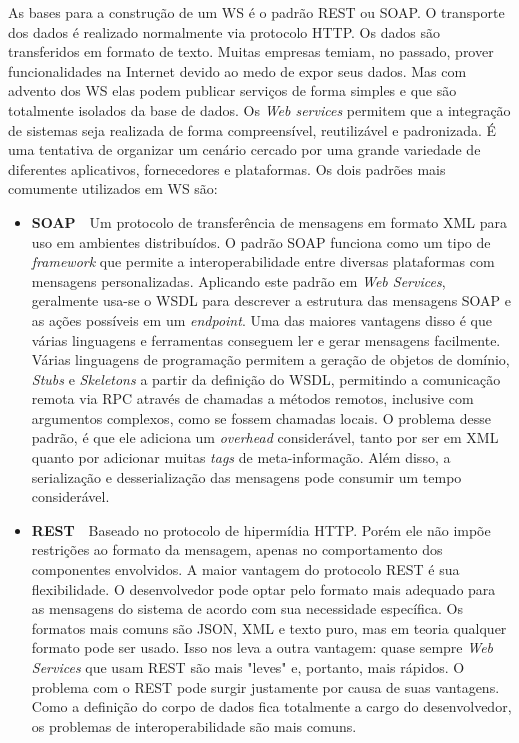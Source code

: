 As bases para a construção de um WS é o padrão REST ou SOAP. O transporte dos dados é realizado normalmente via protocolo HTTP. Os dados são transferidos em formato de texto. Muitas empresas temiam, no passado, prover funcionalidades na Internet devido ao medo de expor seus dados. Mas com advento dos WS elas podem publicar serviços de forma simples e que são totalmente isolados da base de dados. Os \textit{Web services} permitem que a integração de sistemas seja realizada de forma compreensível, reutilizável e padronizada. É uma tentativa de organizar um cenário cercado por uma grande variedade de diferentes aplicativos, fornecedores e plataformas. Os dois padrões mais comumente utilizados em WS são:
\begin{itemize}
    \item \textbf{SOAP}~\textemdash~Um protocolo de transferência de mensagens em formato XML para uso em ambientes distribuídos. O padrão SOAP funciona como um tipo de \textit{framework} que permite a interoperabilidade entre diversas plataformas com mensagens personalizadas. Aplicando este padrão em \textit{Web Services}, geralmente usa-se o WSDL para descrever a estrutura das mensagens SOAP e as ações possíveis em um \textit{endpoint}. Uma das maiores vantagens disso é que várias linguagens e ferramentas conseguem ler e gerar mensagens facilmente. Várias linguagens de programação permitem a geração de objetos de domínio, \textit{Stubs} e \textit{Skeletons} a partir da definição do WSDL, permitindo a comunicação remota via RPC através de chamadas a métodos remotos, inclusive com argumentos complexos, como se fossem chamadas locais. O problema desse padrão, é que ele adiciona um \textit{overhead} considerável, tanto por ser em XML quanto por adicionar muitas \textit{tags} de meta-informação. Além disso, a serialização e desserialização das mensagens pode consumir um tempo considerável.
    \item \textbf{REST}~\textemdash~Baseado no protocolo de hipermídia HTTP. Porém ele não impõe restrições ao formato da mensagem, apenas no comportamento dos componentes envolvidos. A maior vantagem do protocolo REST é sua flexibilidade. O desenvolvedor pode optar pelo formato mais adequado para as mensagens do sistema de acordo com sua necessidade específica. Os formatos mais comuns são JSON, XML e texto puro, mas em teoria qualquer formato pode ser usado. Isso nos leva a outra vantagem: quase sempre \textit{Web Services} que usam REST são mais "leves" e, portanto, mais rápidos. O problema com o REST pode surgir justamente por causa de suas vantagens. Como a definição do corpo de dados fica totalmente a cargo do desenvolvedor, os problemas de interoperabilidade são mais comuns.
\end{itemize}


